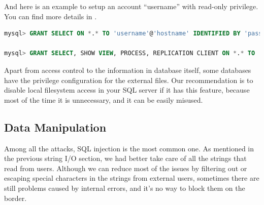 \documentclass[conference]{IEEEtran}
\begin{document}
And here is an example to setup an account ``username'' with read-only privilege.
You can find more details in \cite{MySQL_privilage_detail}.
\begin{lstlisting}[language=sql]
mysql> GRANT SELECT ON *.* TO 'username'@'hostname' IDENTIFIED BY 'password';

mysql> GRANT SELECT, SHOW VIEW, PROCESS, REPLICATION CLIENT ON *.* TO ...
\end{lstlisting}




Apart from access control to the information in database itself,
some databases have the privilege configuration for
the external files.
Our recommendation is to
disable local filesystem access in your SQL server if it has this feature,
because most of the time it is unnecessary, and it can be easily misused.

\subsection{Data Manipulation}
Among all the attacks, SQL injection is the most common one.
As mentioned in the previous string I/O section,
we had better take care of all the strings that read from users.
Although we can reduce most of the issues by
filtering out or escaping special characters in the strings
from external users, sometimes there are still
problems caused by internal errors,
and it's no way to block them on the border.
\end{document}
